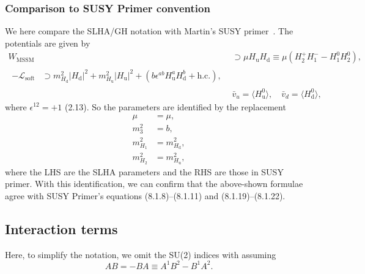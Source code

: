 \documentclass[a4paper,11pt,captions=tableheading,DIV=12]{scrartcl}
\newcommand\w[1]{_{\mathrm{#1}}}
\begin{document}
\subsubsection{Comparison to SUSY Primer convention}
We here compare the SLHA/GH notation with Martin's SUSY primer~\cite{Martin:1997ns}.
The potentials are given by
\begin{align}
 W\w{MSSM}
&\supset
 \mu H\w u H\w d 
\equiv
\mu (H_2^+H_1^- - H_1^0H_2^0),\tag{SP:6.1.1--3}\\
%
\begin{split}
-\mathcal L\w{soft}&\supset
  m_{H\w d}^{2}|H\w d|^2
 + m_{H\w u}^{2}|H\w u|^2
 + (b\epsilon^{ab}H\w u^aH\w d^b +\text{h.c.}),
\end{split}\tag{SP:6.3.1}
\\
&\bar v_u = \langle{H\w u^0}\rangle,\quad \bar v_d = \langle{H\w d^0}\rangle,
\tag{SP:8.1.5}
%
\end{align}
where $\epsilon^{12}=+1$ (2.13).
So the parameters are identified by the replacement
\begin{align}
\mu&=\mu,\\
m_3^2&=b,
\\
m_{H_1}^2 &= m_{H\w d}^2,
\\
m_{H_2}^2 &= m_{H\w u}^2,
\end{align}
where the LHS are the SLHA parameters and the RHS are those in SUSY primer.
With this identification, we can confirm that the above-shown formulae agree with SUSY Primer's equations (8.1.8)--(8.1.11) and (8.1.19)--(8.1.22).



\subsection{Interaction terms}
Here, to simplify the notation, we omit the SU(2) indices with assuming
\begin{equation*}
 AB=-BA\equiv A^1B^2-B^1A^2.
\end{equation*}
\end{document}
